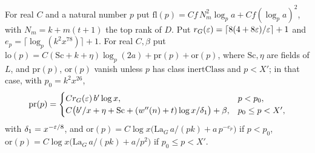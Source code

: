 \begin{definition}\label{geob:loG}
For real $C$ and a natural number $p$ put
$\mathrm{fl}(p)=Cf\,N_m^2\log_p a+Cf(\log_p a)^2$, with $N_m=k+m(t+1)$ the
top rank of $D$. Put $r_G(\varepsilon)=\lceil 8(4+8\varepsilon)/\varepsilon\rceil+1$ and
$e_p=\lceil\log_p(k^2x^{78})\rceil+1$. For real $C,\beta$ put
$\mathrm{lo}(p)=C(\mathrm{Sc}+k+\eta)\log_p(2a)+\mathrm{pr}(p)+\mathrm{or}(p)$,
where $\mathrm{Sc},\eta$ are fields of $L$, and $\mathrm{pr}(p)$,
$\mathrm{or}(p)$ vanish unless $p$ has class $\mathrm{inertClass}$ and
$p<X'$; in that case, with $p_0=k^2x^{26}$,
\[
\mathrm{pr}(p)=\begin{cases}Cr_G(\varepsilon)\,b'\log x,&p<p_0,\\
C\bigl(b'/x+\eta+\mathrm{Sc}+(w''(n)+t)\log x/\delta_1\bigr)+\beta,&p_0\le p<X',\end{cases}
\]
with $\delta_1=x^{-\varepsilon/8}$, and
$\mathrm{or}(p)=C\log x\bigl(\mathrm{La}_G\,a/(pk)+a\,p^{-e_p}\bigr)$ if
$p<p_0$, $\mathrm{or}(p)=C\log x\bigl(\mathrm{La}_G\,a/(pk)+a/p^2\bigr)$ if
$p_0\le p<X'$.
\end{definition}

